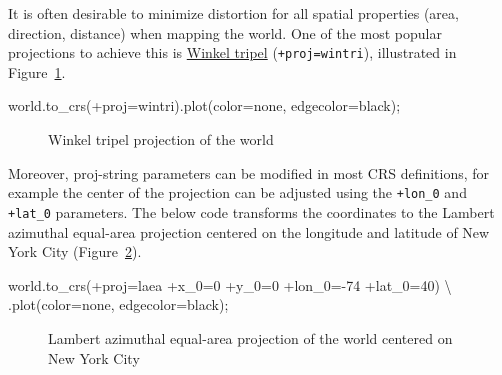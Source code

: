 \documentclass[
  letterpaper,
]{krantz}
\newenvironment{Shaded}{\begin{snugshade}}{\end{snugshade}}
\newcommand{\NormalTok}[1]{\textcolor[rgb]{0.00,0.23,0.31}{#1}}
\newcommand{\OperatorTok}[1]{\textcolor[rgb]{0.37,0.37,0.37}{#1}}
\newcommand{\StringTok}[1]{\textcolor[rgb]{0.13,0.47,0.30}{#1}}
\begin{document}
It is often desirable to minimize distortion for all spatial properties
(area, direction, distance) when mapping the world. One of the most
popular projections to achieve this is
\href{http://www.winkel.org/other/Winkel\%20Tripel\%20Projections.htm}{Winkel
tripel} (\texttt{\textquotesingle{}+proj=wintri\textquotesingle{}}),
illustrated in Figure~\ref{fig-wintri}.

\begin{Shaded}
\begin{Highlighting}[]
\NormalTok{world.to\_crs(}\StringTok{\textquotesingle{}+proj=wintri\textquotesingle{}}\NormalTok{).plot(color}\OperatorTok{=}\StringTok{\textquotesingle{}none\textquotesingle{}}\NormalTok{, edgecolor}\OperatorTok{=}\StringTok{\textquotesingle{}black\textquotesingle{}}\NormalTok{)}\OperatorTok{;}
\end{Highlighting}
\end{Shaded}

\begin{figure}[H]


\caption{\label{fig-wintri}Winkel tripel projection of the world}

\end{figure}%

Moreover, proj-string parameters can be modified in most CRS
definitions, for example the center of the projection can be adjusted
using the \texttt{+lon\_0} and \texttt{+lat\_0} parameters. The below
code transforms the coordinates to the Lambert azimuthal equal-area
projection centered on the longitude and latitude of New York City
(Figure~\ref{fig-azimuthal-equal-area}).

\begin{Shaded}
\begin{Highlighting}[]
\NormalTok{world.to\_crs(}\StringTok{\textquotesingle{}+proj=laea +x\_0=0 +y\_0=0 +lon\_0={-}74 +lat\_0=40\textquotesingle{}}\NormalTok{) }\OperatorTok{\textbackslash{}}
\NormalTok{    .plot(color}\OperatorTok{=}\StringTok{\textquotesingle{}none\textquotesingle{}}\NormalTok{, edgecolor}\OperatorTok{=}\StringTok{\textquotesingle{}black\textquotesingle{}}\NormalTok{)}\OperatorTok{;}
\end{Highlighting}
\end{Shaded}

\begin{figure}[H]


\caption{\label{fig-azimuthal-equal-area}Lambert azimuthal equal-area
projection of the world centered on New York City}

\end{figure}%
\end{document}
